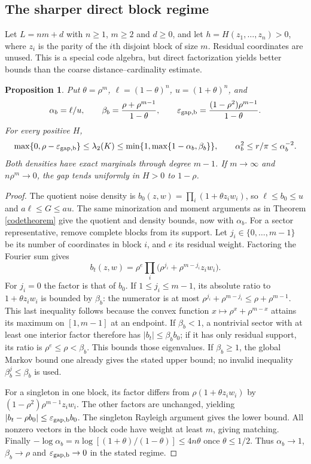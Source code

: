 \documentclass[11pt]{article}
\newtheorem{proposition}[theorem]{Proposition}
\begin{document}
\subsection{The sharper direct block regime}
Let $L=nm+d$ with $n\geq1$, $m\geq2$ and $d\geq0$, and let $h=H(z_1,\ldots,z_n)>0$, where $z_i$ is the parity of the $i$th disjoint block of size $m$. Residual coordinates are unused. This is a special code algebra, but direct factorization yields better bounds than the coarse distance--cardinality estimate.
\begin{proposition}\label{blocktheorem}
Put $\theta=\rho^m$, $\ell=(1-\theta)^n$, $u=(1+\theta)^n$, and
\[
 \alpha_b=\ell/u,\qquad
 \beta_b=\frac{\rho+\rho^{m-1}}{1-\theta},\qquad
 \varepsilon_{\rm gap,b}=\frac{(1-\rho^2)\rho^{m-1}}{1-\theta}.
\]
For every positive $H$,
\[
 \max\{0,\rho-\varepsilon_{\rm gap,b}\}\leq\lambda_2(K)
 \leq\min\{1,\max\{1-\alpha_b,\beta_b\}\},\qquad
 \alpha_b^2\leq r/\pi\leq\alpha_b^{-2}.
\]
Both densities have exact marginals through degree $m-1$. If $m\to\infty$ and $n\rho^m\to0$, the gap tends uniformly in $H>0$ to $1-\rho$.
\end{proposition}
\begin{proof}
The quotient noise density is $b_0(z,w)=\prod_i(1+\theta z_iw_i)$, so $\ell\leq b_0\leq u$ and $a\ell\leq G\leq au$. The same minorization and moment arguments as in Theorem \ref{codetheorem} give the quotient and density bounds, now with $\alpha_b$.
For a sector representative, remove complete blocks from its support. Let $j_i\in\{0,\ldots,m-1\}$ be its number of coordinates in block $i$, and $e$ its residual weight. Factoring the Fourier sum gives
\[
 b_t(z,w)=\rho^e\prod_i\bigl(\rho^{j_i}+\rho^{m-j_i}z_iw_i\bigr).
\]
For $j_i=0$ the factor is that of $b_0$. If $1\leq j_i\leq m-1$, its absolute ratio to $1+\theta z_iw_i$ is bounded by $\beta_b$: the numerator is at most $\rho^{j_i}+\rho^{m-j_i}\leq\rho+\rho^{m-1}$. This last inequality follows because the convex function $x\mapsto\rho^x+\rho^{m-x}$ attains its maximum on $[1,m-1]$ at an endpoint. If $\beta_b<1$, a nontrivial sector with at least one interior factor therefore has $|b_t|\leq\beta_b b_0$; if it has only residual support, its ratio is $\rho^e\leq\rho<\beta_b$. This bounds those eigenvalues. If $\beta_b\geq1$, the global Markov bound one already gives the stated upper bound; no invalid inequality $\beta_b^j\leq\beta_b$ is used.

For a singleton in one block, its factor differs from $\rho(1+\theta z_iw_i)$ by $(1-\rho^2)\rho^{m-1}z_iw_i$. The other factors are unchanged, yielding
$|b_t-\rho b_0|\leq\varepsilon_{\rm gap,b}b_0$. The singleton Rayleigh argument gives the lower bound. All nonzero vectors in the block code have weight at least $m$, giving matching. Finally
$-\log\alpha_b=n\log[(1+\theta)/(1-\theta)]\leq4n\theta$ once $\theta\leq1/2$. Thus $\alpha_b\to1$, $\beta_b\to\rho$ and $\varepsilon_{\rm gap,b}\to0$ in the stated regime.
\end{proof}
\end{document}
